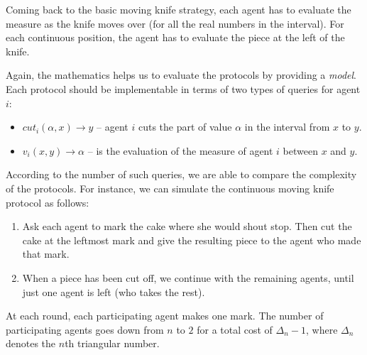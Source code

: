 Coming back to the basic moving knife strategy, each agent has to evaluate the measure as the knife moves over (for all the real numbers in the interval). 
For each continuous position, the agent has to evaluate the piece at the left of the knife.

Again, the mathematics helps us to evaluate the protocols by providing a \textit{model}.
Each protocol should be implementable in terms of two types of queries for agent $i$:
 \begin{itemize}
 \item $cut_i(\alpha,x) \rightarrow y$ -- agent $i$ cuts the part of value $\alpha$ in the interval from $x$ to $y$. 
 \item $v_i(x,y) \rightarrow \alpha$ -- is the evaluation of the measure of agent $i$  between $x$ and $y$.
 \end{itemize}
 
According to the number of such queries, we are able to compare the complexity of the protocols.
For instance, we can simulate the continuous moving knife protocol as follows:
\begin{enumerate}
\item
Ask each agent to mark the cake where she would shout stop.
Then cut the cake at the leftmost mark and give the resulting piece to the agent who made that mark.
\item
When a piece has been cut off, we continue with the remaining agents, until just one agent is left (who takes the rest).
\end{enumerate}

At each round, each participating agent makes one mark. 
The number of participating agents goes down from $n$ to $2$ for a total cost of $\Delta_n -1$, 
where $\Delta_n$ denotes the $n$th triangular number. 





